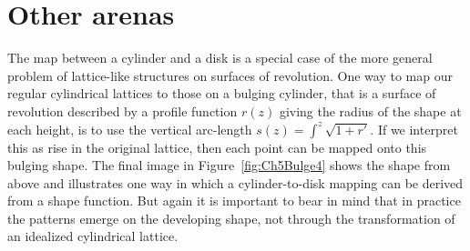 \section{Other arenas}
The map between a cylinder and a disk is a special case of the more general problem of lattice-like structures on surfaces of revolution. One way to map our regular cylindrical lattices to those on a bulging cylinder, that is a surface of revolution described by a profile function $r(z)$ giving the radius of the shape at each height, is to use the vertical arc-length $s(z)=\int^z \sqrt{1+r'}$.  If we interpret this as rise in the original lattice, then each point can be mapped 
onto this bulging shape. The final image in Figure~\ref{fig:Ch5Bulge4} shows the shape from above and illustrates 
one way in which a cylinder-to-disk mapping can be derived from a shape function. But again it is important to bear in mind that in practice the patterns emerge on the developing shape, not through the transformation of an idealized cylindrical lattice. 

